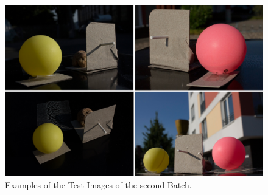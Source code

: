 \begin{figure}[H] 
	\center 
	\includegraphics[width=12cm]{Images/batch2.jpg}			
	\caption[Examples of the Test Images of the second Batch.]{Examples of the Test Images of the second Batch.}
	\label{fig:batch2}
\end{figure}

\newpage